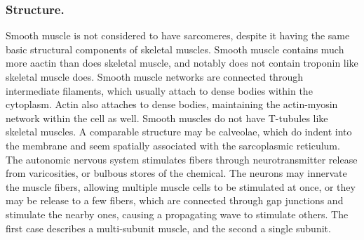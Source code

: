 \documentclass[12pt]{report}
\begin{document}
\subsubsection{Structure.}
Smooth muscle is not considered to have sarcomeres, despite it having the same basic structural components of skeletal muscles. Smooth muscle contains much more aactin than does skeletal muscle, and notably does not contain troponin like skeletal muscle does. Smooth muscle networks are connected through intermediate filaments, which usually attach to dense bodies within the cytoplasm. Actin also attaches to dense bodies, maintaining the actin-myosin network within the cell as well. Smooth muscles do not have T-tubules like skeletal muscles. A comparable structure may be calveolae, which do indent into the membrane and seem spatially associated with the sarcoplasmic reticulum. The autonomic nervous system stimulates fibers through neurotransmitter release from varicosities, or bulbous stores of the chemical. The neurons may innervate the muscle fibers, allowing multiple muscle cells to be stimulated at once, or they may be release to a few fibers, which are connected through gap junctions and stimulate the nearby ones, causing a propagating wave to stimulate others. The first case describes a multi-subunit muscle, and the second a single subunit. 
\end{document}
